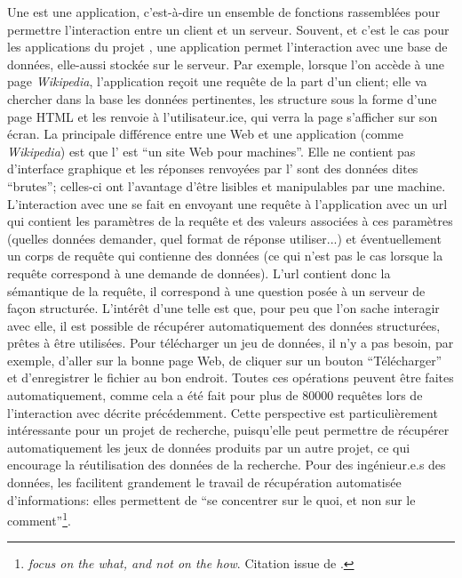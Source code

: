 Une \api{} est une application, c'est-à-dire un ensemble de fonctions rassemblées pour permettre l'interaction entre un client et un serveur. Souvent, et c'est le cas pour les applications du projet \mssktb{}, une application permet l'interaction avec une base de données, elle-aussi stockée sur le serveur. Par exemple, lorsque l'on accède à une page \textit{Wikipedia}, l'application reçoit une requête de la part d'un client; elle va chercher dans la base les données pertinentes, les structure sous la forme d'une page HTML et les renvoie à l'utilisateur.ice, qui verra la page s'afficher sur son écran. La principale différence entre une \api{} Web et une application (comme \textit{Wikipedia}) est que l'\api{} est \enquote{un site Web pour machines}. Elle ne contient pas d'interface graphique et les réponses renvoyées par l'\api{} sont des données dites \enquote{brutes}; celles-ci ont l'avantage d'être lisibles et manipulables par une machine. L'interaction avec une \api{} se fait en envoyant une requête à l'application avec un \gls{url} qui contient les paramètres de la requête et des valeurs associées à ces paramètres (quelles données demander, quel format de réponse utiliser...) et éventuellement un corps de requête qui contienne des données (ce qui n'est pas le cas lorsque la requête correspond à une demande de données). L'\gls{url} contient donc la sémantique de la requête, il correspond à une question posée à un serveur de façon structurée. L'intérêt d'une telle \api{} est que, pour peu que l'on sache interagir avec elle, il est possible de récupérer automatiquement des données structurées, prêtes à être utilisées. Pour télécharger un jeu de données, il n'y a pas besoin, par exemple, d'aller sur la bonne page Web, de cliquer sur un bouton \enquote{Télécharger} et d'enregistrer le fichier au bon endroit. Toutes ces opérations peuvent être faites automatiquement, comme cela a été fait pour plus de 80000 requêtes lors de l'interaction avec \wkd{} décrite précédemment. Cette perspective est particulièrement intéressante pour un projet de recherche, puisqu'elle peut permettre de récupérer automatiquement les jeux de données produits par un autre projet, ce qui encourage la réutilisation des données de la recherche. Pour des ingénieur.e.s des données, les \api{} facilitent grandement le travail de récupération automatisée d'informations: elles permettent de \enquote{se concentrer sur le quoi, et non sur le comment}\footnote{\textit{focus on the what, and not on the how}. Citation issue de \cite[p. 2]{murdock_inpho_2011}.}.

